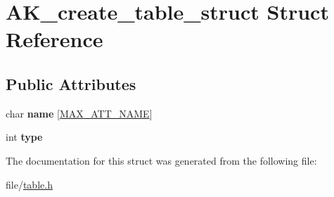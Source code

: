 \hypertarget{structAK__create__table__struct}{}\section{A\+K\+\_\+create\+\_\+table\+\_\+struct Struct Reference}
\label{structAK__create__table__struct}
\subsection*{Public Attributes}
\begin{DoxyCompactItemize}
\item 
\mbox{\label{structAK__create__table__struct_a22326c60182d352e7970c404a4771181}} 
char {\bfseries name} \mbox{[}\hyperlink{constants_8h_ad221251e45ce1d6bfb3eff3b142c0fcd}{M\+A\+X\+\_\+\+A\+T\+T\+\_\+\+N\+A\+ME}\mbox{]}
\item 
\mbox{\label{structAK__create__table__struct_aa252469c3f2dbd3585f6a14b862b72f7}} 
int {\bfseries type}
\end{DoxyCompactItemize}


The documentation for this struct was generated from the following file\+:\begin{DoxyCompactItemize}
\item 
file/\hyperlink{table_8h}{table.\+h}\end{DoxyCompactItemize}
